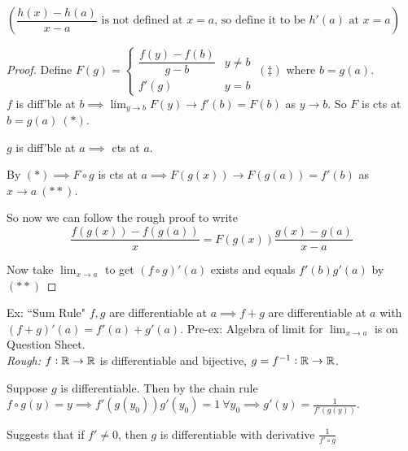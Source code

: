 \documentclass[twoside]{scrartcl}
\begin{document}
$\left(\dfrac{h(x) - h(a)}{x-a} \text{ is not defined at } x=a \text{, so define it to be } h'(a) \text{ at } x=a \right)$\\

\begin{proof}
Define $F(g) = \begin{cases}
 	\dfrac{f(y)-f(b)}{g-b} & y \neq b\\
 	f'(g) &  y = b 
 \end{cases}~(\ddagger)$
 where $b = g(a)$. \vspace*{5pt}\\$f$ is diff'ble at $b \implies \lim_{y \to b} F(y) \to f'(b) = F(b)$ as $y \to b$. So $F$ is cts at $b = g(a) ~(*)$. 
 
 $g$ is diff'ble at $a \implies$ cts at $a$. 
 
 By $(*) \implies F \circ g$ is cts at $a \implies F(g(x)) \to F(g(a)) = f'(b)$ as $x \to a ~(**)$. 
 
 So now we can follow the rough proof to write 
 \[\frac{f(g(x)) -f(g(a))}{x} = F(g(x))\frac{g(x) - g(a)}{x-a}\]
 

 
 Now take $\lim_{x\to a}$ to get $(f\circ g)'(a)$ exists and equals $f'(b)g'(a)$ by $(**)$ \end{proof}\vspace*{5pt}
 
 Ex: ``Sum Rule" $f, g$ are differentiable at $a\implies f+g$ are differentiable at $a$ with $(f+g)'(a) = f'(a) + g'(a)$. Pre-ex: Algebra of limit for $\lim_{x\to a}$ is on Question Sheet.\\
 
 \emph{Rough:} $f: \mathbb{R}\to \mathbb{R}$ is differentiable and bijective, $g = f^{-1}: \mathbb{R} \to \mathbb{R}$.
 
  Suppose $g$ is differentiable. Then by the chain rule $f\circ g(y) = y \implies f'(g(y_0))g'(y_0) = 1~\forall y_0 \implies g'(y) = \frac{1}{f'(g(y))}$. 
  
  Suggests that if $f' \neq 0$, then $g$ is differentiable with derivative $\frac{1}{f'\circ g}$\vspace*{5pt}
\end{document}
